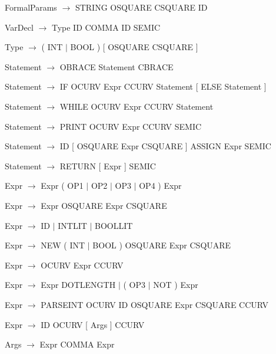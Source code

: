 \documentclass[12pt]{article}
\begin{document}
\hspace{-1cm}FormalParams $\rightarrow$ STRING OSQUARE CSQUARE ID

\hspace{-1cm}VarDecl $\rightarrow$ Type ID { COMMA ID } SEMIC

\hspace{-1cm}Type $\rightarrow$ ( INT $\mid$ BOOL ) [ OSQUARE CSQUARE ]

\hspace{-1cm}Statement $\rightarrow$ OBRACE { Statement } CBRACE

\hspace{-1cm}Statement $\rightarrow$ IF OCURV Expr CCURV Statement [ ELSE Statement ]

\hspace{-1cm}Statement $\rightarrow$ WHILE OCURV Expr CCURV Statement

\hspace{-1cm}Statement $\rightarrow$ PRINT OCURV Expr CCURV SEMIC

\hspace{-1cm}Statement $\rightarrow$ ID [ OSQUARE Expr CSQUARE ] ASSIGN Expr SEMIC

\hspace{-1cm}Statement $\rightarrow$ RETURN [ Expr ] SEMIC

\hspace{-1cm}Expr $\rightarrow$ Expr ( OP1 $\mid$ OP2 $\mid$ OP3 $\mid$ OP4 ) Expr

\hspace{-1cm}Expr $\rightarrow$ Expr OSQUARE Expr CSQUARE

\hspace{-1cm}Expr $\rightarrow$ ID $\mid$ INTLIT $\mid$ BOOLLIT

\hspace{-1cm}Expr $\rightarrow$ NEW ( INT $\mid$ BOOL ) OSQUARE Expr CSQUARE

\hspace{-1cm}Expr $\rightarrow$ OCURV Expr CCURV

\hspace{-1cm}Expr $\rightarrow$ Expr DOTLENGTH $\mid$ ( OP3 $\mid$ NOT ) Expr

\hspace{-1cm}Expr $\rightarrow$ PARSEINT OCURV ID OSQUARE Expr CSQUARE CCURV

\hspace{-1cm}Expr $\rightarrow$ ID OCURV [ Args ] CCURV

\hspace{-1cm}Args $\rightarrow$ Expr { COMMA Expr }
\end{document}
